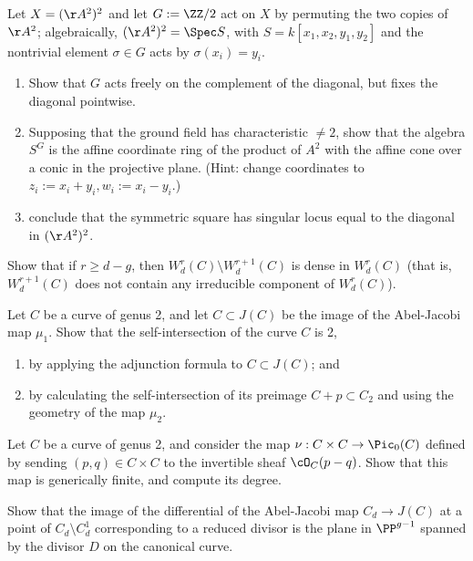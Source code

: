 \begin{exercise}
 \label{sym2A2} 
 Let $X = (\AA^{2})^{2}$ and let $G := \ZZ/2$ act on $X$ by permuting the two copies of  $\AA^{2}$; algebraically,
$(\AA^{2})^{2} = \Spec S$, with $S = k[x_{1},x_{2}, y_{1}, y_{2}]$ and the nontrivial element $\sigma\in G$ acts by
$\sigma(x_{i}) = y_{i}$. 
 \begin{enumerate}
\item Show that $G$ acts freely on the complement of the diagonal, but fixes the diagonal pointwise.
\item Supposing that the ground field has characteristic $\neq 2$,
show that the algebra $S^{G}$ is the affine coordinate ring of the product
of $A^2$ with the affine cone over a conic in the projective plane. 
(Hint: change coordinates to $z_i := x_i+y_i, w_i := x_i - y_i$.)
\item conclude that the symmetric square has singular locus equal to the diagonal in 
$(\AA^{2})^{2}$.
\end{enumerate}
\end{exercise}

\begin{exercise}
Show that if $r \geq d-g$, then $W^r_d(C) \setminus W^{r+1}_d(C)$ is dense in $W^r_d(C)$ (that is, $W^{r+1}_d(C)$ does not contain any irreducible component of $W^r_d(C)$).

\end{exercise}

\begin{exercise}
Let $C$ be a curve of genus 2, and let $C \subset J(C)$ be the image of the Abel-Jacobi map $\mu_1$. Show that the self-intersection of the curve $C$ is 2,
\begin{enumerate}
\item by applying the adjunction formula to $C \subset J(C)$; and
\item by calculating the self-intersection of its preimage $C + p \subset C_2$ and using the geometry of the map $\mu_2$.
\end{enumerate}
\end{exercise}

\begin{exercise}
Let $C$ be a curve of genus 2, and consider the map $\nu : C \times C \to \Pic_0(C)$ defined by sending $(p, q)\in C \times C$ to the invertible sheaf $\cO_C(p-q)$. Show that this map is generically finite, and compute its degree.
\end{exercise}

\begin{exercise} \label{comparison with geometric RR}
Show that the image of the differential of the Abel-Jacobi map $C_{d} \to J(C)$ at a point of $C_{d} \setminus C^1_d$  corresponding to a reduced divisor is  the plane in $\PP^{g-1}$ spanned by the divisor $D$ on the canonical curve.

\end{exercise}

